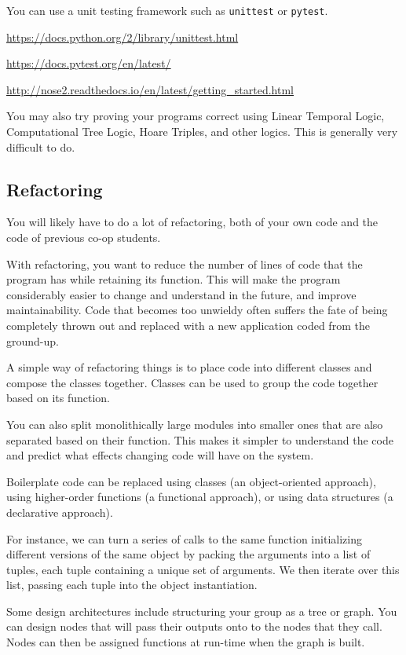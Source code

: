 \documentclass{article}
\begin{document}
You can use a unit testing framework such as \texttt{unittest} or \texttt{pytest}.

\url{https://docs.python.org/2/library/unittest.html}

\url{https://docs.pytest.org/en/latest/}

\url{http://nose2.readthedocs.io/en/latest/getting_started.html}

You may also try proving your programs correct
using Linear Temporal Logic, Computational Tree Logic, 
Hoare Triples, and other logics. This is generally 
very difficult to do.

\subsection{Refactoring}

You will likely have to do a lot of refactoring, both of your own 
code and the code of previous co-op students.

With refactoring, you want to reduce the number of lines of code
that the program has while retaining its function.
This will make the program considerably easier to change 
and understand in the future, and improve maintainability.
Code that becomes too unwieldy often suffers the fate of 
being completely thrown out and replaced with a new application
coded from the ground-up.

A simple way of refactoring things is to place code into different classes
and compose the classes together. Classes can be used to group the code together based on its function.

You can also split monolithically large modules into smaller ones
that are also separated based on their function.
This makes it simpler to understand the code and predict
what effects changing code will have on the system.

Boilerplate code can be replaced using classes (an object-oriented approach), using higher-order functions (a functional approach), or using data structures  (a declarative approach).

For instance, we can turn a series of calls to the same function
initializing different versions of the same object by packing the arguments
into a list of tuples, each tuple containing a unique set of arguments.
We then iterate over this list, passing each tuple into the object instantiation.

Some design architectures include structuring your group as a tree or graph.
You can design nodes that will pass their outputs onto to the nodes
that they call. Nodes can then be assigned functions at run-time when the 
graph is built.
\end{document}
